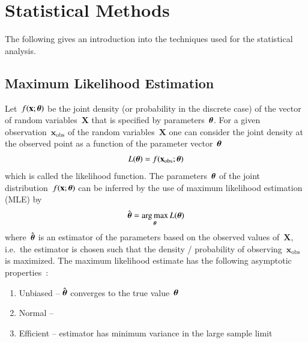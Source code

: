 \chapter{Statistical Methods}
\label{sec:statistical_methods}

The following gives an introduction into the techniques used for the
statistical analysis.


\section{Maximum Likelihood Estimation}


Let~$f(\mathbf{x}; \boldsymbol{\theta})$ be the joint density (or
probability in the discrete case) of the vector of random
variables~$\mathbf{X}$ that is specified by
parameters~$\boldsymbol{\theta}$. For a given
observation~$\mathbf{x}_\text{obs}$ of the random variables~$\mathbf{X}$ one
can consider the joint density at the observed point as a function of
the parameter vector~$\boldsymbol{\theta}$
\begin{align*}
  L(\boldsymbol{\theta}) = f(\mathbf{x}_\text{obs}; \boldsymbol{\theta})
\end{align*}
which is called the likelihood function. The parameters~$\boldsymbol{\theta}$
of the joint distribution~$f(\mathbf{x}; \boldsymbol{\theta})$ can be inferred
by the use of maximum likelihood estimation (MLE) by
\begin{align*}
  \hat{\boldsymbol{\theta}} = \operatorname*{arg\,max}_{\boldsymbol{\theta}} L(\boldsymbol{\theta})
\end{align*}
where~$\hat{\boldsymbol{\theta}}$ is an estimator of the parameters based on
the observed values of~$\mathbf{X}$, i.e.\ the estimator is chosen
such that the density / probability of
observing~$\mathbf{x}_\text{obs}$ is maximized. The maximum likelihood
estimate has the following asymptotic properties~\cite{cramer1999}:
\begin{enumerate}
\item Unbiased -- $\hat{\boldsymbol{\theta}}$ converges to the true
  value~$\boldsymbol{\theta}$
\item Normal --
\item Efficient -- estimator has minimum variance in the large sample limit
\end{enumerate}

